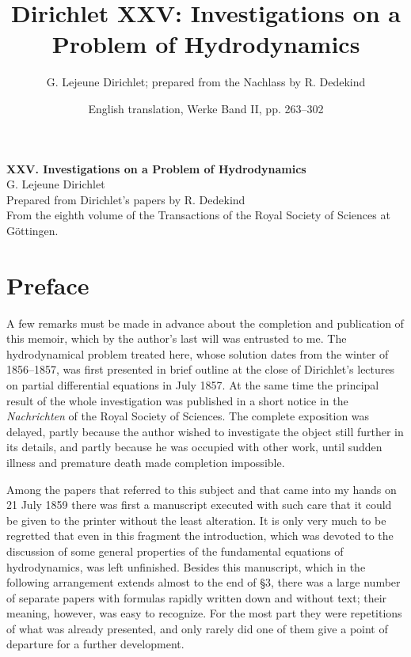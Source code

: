 \documentclass[11pt]{article}
\title{Dirichlet XXV: Investigations on a Problem of Hydrodynamics}
\author{G. Lejeune Dirichlet; prepared from the Nachlass by R. Dedekind}
\date{English translation, Werke Band II, pp. 263--302}
\begin{document}
\maketitle

\begin{center}
{\Large \textbf{XXV. Investigations on a Problem of Hydrodynamics}}\\[0.5em]
G. Lejeune Dirichlet\\
Prepared from Dirichlet's papers by R. Dedekind\\
From the eighth volume of the Transactions of the Royal Society of Sciences at Göttingen.
\end{center}

\section*{Preface}

A few remarks must be made in advance about the completion and publication of this memoir, which by the author's last will was entrusted to me.  The hydrodynamical problem treated here, whose solution dates from the winter of 1856--1857, was first presented in brief outline at the close of Dirichlet's lectures on partial differential equations in July 1857.  At the same time the principal result of the whole investigation was published in a short notice in the \emph{Nachrichten} of the Royal Society of Sciences.  The complete exposition was delayed, partly because the author wished to investigate the object still further in its details, and partly because he was occupied with other work, until sudden illness and premature death made completion impossible.

Among the papers that referred to this subject and that came into my hands on 21 July 1859 there was first a manuscript executed with such care that it could be given to the printer without the least alteration.  It is only very much to be regretted that even in this fragment the introduction, which was devoted to the discussion of some general properties of the fundamental equations of hydrodynamics, was left unfinished.  Besides this manuscript, which in the following arrangement extends almost to the end of \S3, there was a large number of separate papers with formulas rapidly written down and without text; their meaning, however, was easy to recognize.  For the most part they were repetitions of what was already presented, and only rarely did one of them give a point of departure for a further development.
\end{document}
